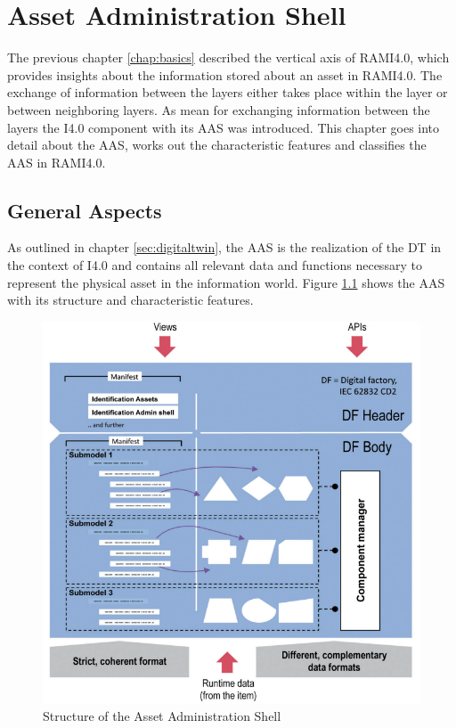 \chapter{Asset Administration Shell} \label{chap:aas-and-rami}
The previous chapter \ref{chap:basics} described the vertical axis of \ac{RAMI4.0}, which provides insights about the information stored about an asset in \ac{RAMI4.0}. The exchange of information between the layers either takes place within the layer or between neighboring layers. As mean for exchanging information between the layers the \ac{I4.0} component with its \ac{AAS} was introduced. This chapter goes into detail about the \ac{AAS}, works out the characteristic features and classifies the \ac{AAS} in \ac{RAMI4.0}.


\section{General Aspects} \label{sec:assetadministrationshell}
As outlined in chapter \ref{sec:digitaltwin}, the \ac{AAS} is the realization of the \ac{DT} in the context of \ac{I4.0} and contains all relevant data and functions necessary to represent the physical asset in the information world. Figure \ref{fig:structureaas} shows the \ac{AAS} with its structure and characteristic features.

\begin{figure}[h]
\centering
\includegraphics[scale=0.8]{content/pictures/structure_aas_zvei.png}
\caption{Structure of the Asset Administration Shell}
\label{fig:structureaas}
\end{figure}

